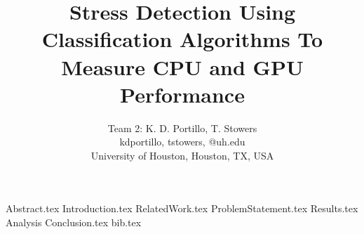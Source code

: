\documentclass{IEEEtran}
\begin{document}
 
\title{Stress Detection Using Classification Algorithms To Measure CPU and GPU Performance}
\author{Team 2: K. D. Portillo, T. Stowers \\
        kdportillo, tstowers, @uh.edu \\
        University of Houston, Houston, TX, USA}
\maketitle
{}

{Abstract.tex}
{Introduction.tex}
{RelatedWork.tex}
{ProblemStatement.tex}
{Results.tex}
{Analysis}
{Conclusion.tex}
{bib.tex}
\end{document}
